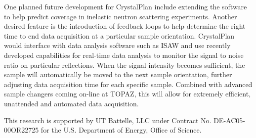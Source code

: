 \documentclass[final]{iucr}              %
\begin{document}
One planned future development for CrystalPlan include extending the software
to help predict coverage in inelastic neutron scattering experiments. Another
desired feature is the introduction of feedback loops to help determine the
right time to end data acquisition at a particular sample orientation.
CrystalPlan would interface with data analysis software such as ISAW and use
recently developed capabilities for real-time data analysis to monitor
the  signal to noise ratio on particular reflections. When the signal intensity
becomes sufficient, the sample will automatically be moved to the next sample
orientation, further adjusting data acquisition time for each specific sample.
Combined with advanced sample changers coming on-line at TOPAZ, this will allow
for extremely efficient, unattended and automated data acquisition.



























This research is supported by UT Battelle, LLC under Contract No.
DE-AC05-00OR22725 for the U.S. Department of Energy, Office of Science.



     
   
\end{document}
